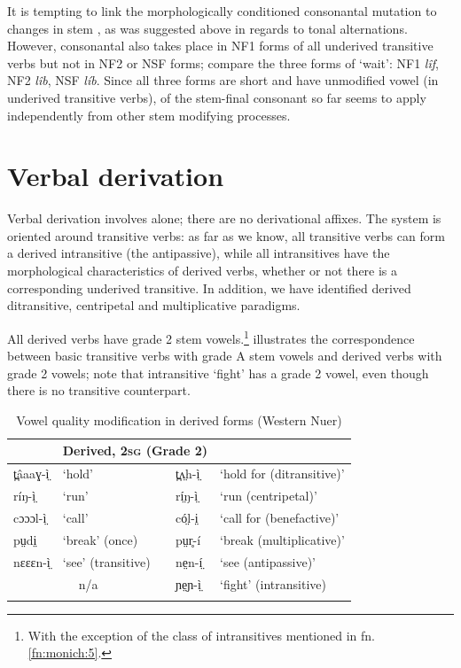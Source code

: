 \documentclass[output=paper
,newtxmath
,modfonts
,nonflat]{langsci/langscibook}
\begin{document}
It is tempting to link the morphologically conditioned consonantal mutation to changes in stem , as was suggested above in regards to tonal alternations. However, consonantal  also takes place in NF1 forms of all underived transitive verbs but not in NF2 or NSF forms; compare the three forms of ‘wait’: NF1 \textit{lîf}, NF2 \textit{lîb}, NSF \textit{líb}.  Since all three forms are short and have unmodified vowel (in underived transitive verbs),  of the stem-final consonant so far seems to apply independently from other stem modifying processes.

\section{Verbal derivation} %

Verbal derivation involves  alone; there are no derivational affixes. The system is oriented around transitive verbs: as far as we know, all transitive verbs can form a derived intransitive (the antipassive), while all intransitives have the morphological characteristics of derived verbs, whether or not there is a corresponding  underived transitive.  In addition, we have identified derived ditransitive, centripetal and multiplicative paradigms.

All derived verbs have grade 2 stem vowels.\footnote{With the exception of the class of intransitives mentioned in fn. \ref{fn:monich:5}.}   illustrates the correspondence between basic transitive verbs with grade A stem vowels and derived verbs with grade 2 vowels; note that intransitive ‘fight’ has a grade 2 vowel, even though there is no transitive counterpart.

\begin{table}
\begin{tabularx}{\textwidth}{lXlX}
\lsptoprule
\multicolumn{2}{c}{\bfseries Basic, 2\textsc{sg} (Grade 1)} & \multicolumn{2}{c}{\bfseries Derived, 2\textsc{sg} (Grade 2)}\\
\midrule
t̪âaaɣ{}-ì̤ & ‘hold’ & t̪ʌ̤h-ì̤ & ‘hold for (ditransitive)’\\
ríŋ-ì̤ & ‘run’ & rí̤ŋ-ì̤ & ‘run (centripetal)’\\
cɔɔɔl-ì̤ & ‘call’ & có̤l-i̤ & ‘call for (benefactive)’\\
pṳdi̤ & ‘break’ (once) & pṳr̥-í & ‘break (multiplicative)’\\
nɛɛɛn-ì̤ & ‘see’ (transitive) & ne̤n-í̤ & ‘see (antipassive)’\\
\multicolumn{2}{c}{n/a} & ɲe̤ɲ-ì̤ & ‘fight’ (intransitive)\\
\lspbottomrule
\end{tabularx}
\caption{Vowel quality modification in derived forms (Western Nuer)}
\label{tab:monich:12}
\end{table}
\end{document}

